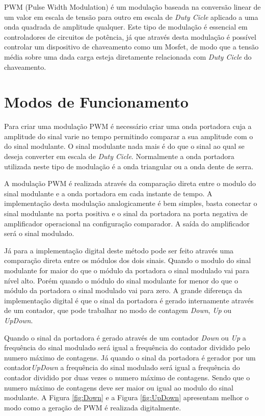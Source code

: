 
PWM (Pulse Width Modulation) é um modulação baseada na conversão linear de um valor em escala de tensão para outro em escala de \emph{Duty Cicle} aplicado a uma onda quadrada de amplitude qualquer. Este tipo de modulação é essencial em controladores de circuitos de potência, já que através desta modulação é possível controlar um dispositivo de chaveamento como um Mosfet,  de modo que a tensão média sobre uma dada carga esteja diretamente relacionada com \emph{Duty Cicle} do chaveamento.  

\section{Modos de Funcionamento}

Para criar uma modulação PWM é necessário criar uma onda portadora cuja a amplitude do sinal varie no tempo permitindo comparar a sua amplitude com o do sinal modulante. O sinal modulante nada mais é do que o sinal ao qual se deseja converter em escala de \emph{Duty Cicle}. Normalmente a onda portadora utilizada neste tipo de modulação é a onda triangular ou a onda dente de serra.
  
A modulação PWM é realizada através da comparação direta entre o modulo do sinal modulante e a onda portadora em cada instante de tempo. A implementação desta modulação analogicamente é bem simples, basta conectar o sinal modulante na porta positiva e o sinal da portadora na porta negativa de amplificador operacional na configuração comparador. A saída do amplificador será o sinal modulado.

Já para a implementação digital deste método pode ser feito através uma comparação direta entre os módulos dos dois sinais. Quando o modulo do sinal modulante for maior do que o  módulo da portadora  o sinal modulado vai para nível alto. Porém quando o módulo do sinal modulante for menor do que o módulo da portadora o sinal  modulado vai para zero. A grande diferença da implementação digital é que o sinal da portadora é gerado internamente através de um contador, que pode trabalhar no modo de contagem \emph{Down}, \emph{Up} ou \emph{UpDown}.

Quando o sinal da portadora é gerado através de um contador \emph{Down} ou \emph{Up}  a frequência do sinal modulado será igual a frequência do contador dividido pelo numero máximo de contagens. Já quando o sinal da portadora é gerador por um contador\emph{UpDown} a frequência do sinal modulado será igual a frequência do contador dividido por duas vezes o numero máximo de contagens. Sendo que o numero máximo de contagens deve ser maior ou igual ao modulo do sinal modulante. A Figura \ref{fig:Down} e a Figura \ref{fig:UpDown} apresentam melhor o modo como a geração de PWM é realizada digitalmente.  

